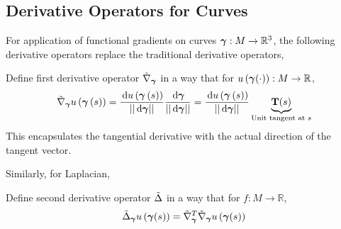 \documentclass[../dissertation.tex]{subfiles}
\begin{document}
\subsection{Derivative Operators for Curves}
For application of functional gradients on curves $\boldsymbol{\gamma}: M \rightarrow \mathbb{R}^3$,
the following derivative operators replace the traditional derivative operators,
\begin{definition}
    Define first derivative operator\cite{YSC2021} $\tilde{\nabla}_{\boldsymbol{\gamma}}$ in a way that for $u \left( \boldsymbol{\gamma} (\cdot) \right): M \rightarrow \mathbb{R}$,
    \begin{equation}
        \tilde{\nabla}_{\boldsymbol{\gamma}} u \left( \boldsymbol{\gamma} \left( s \right) \right)
        = \frac{\, \text{d} u \left( \boldsymbol{\gamma} \left( s \right) \right)}{\lvert \lvert \, \text{d} \boldsymbol{\gamma} \rvert \rvert} \frac{\, \text{d} \boldsymbol{\gamma}}{\lvert \lvert \, \text{d} \boldsymbol{\gamma} \rvert \rvert}
        = \frac{\, \text{d} u \left( \boldsymbol{\gamma} \left( s \right) \right)}{\lvert \lvert \, \text{d} \boldsymbol{\gamma} \rvert \rvert} \underbrace{\mathbf{T}(s)}_{\text{Unit tangent at } s}
        \label{equ: Curve Gradient Operator}
    \end{equation}
    This encapsulates the tangential derivative with the actual direction of the tangent vector.
\end{definition}

Similarly, for Laplacian,
\begin{definition}
    Define second derivative operator $\tilde{\Delta}$ in a way that for $f: M \rightarrow \mathbb{R}$,
    \begin{equation}
        \tilde{\Delta}_{\boldsymbol{\gamma}} u \left( \boldsymbol{\gamma} (s) \right) = \tilde{\nabla}_{\boldsymbol{\gamma}}^{T} \tilde{\nabla}_{\boldsymbol{\gamma}} u \left( \boldsymbol{\gamma} (s) \right)
    \end{equation}
\end{definition}
\end{document}
